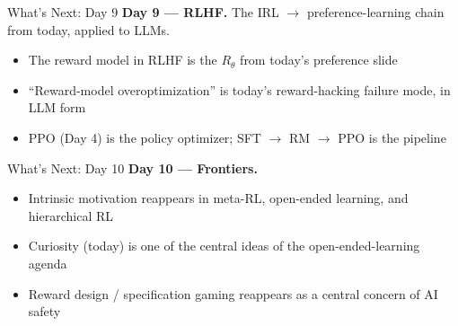\begin{frame}[t]{What's Next: Day 9}
\vspace{0.4em}
\textbf{Day 9 --- RLHF.} The IRL $\to$ preference-learning chain from today, applied to LLMs.
\vspace{0.5em}
\begin{itemize}
    \setlength{\itemsep}{0.6em}
    \item The reward model in RLHF is the $R_\theta$ from today's preference slide
    \item ``Reward-model overoptimization'' is today's reward-hacking failure mode, in LLM form
    \item PPO (Day 4) is the policy optimizer; SFT $\to$ RM $\to$ PPO is the pipeline
\end{itemize}
\end{frame}

\begin{frame}[t]{What's Next: Day 10}
\vspace{0.4em}
\textbf{Day 10 --- Frontiers.}
\vspace{0.5em}
\begin{itemize}
    \setlength{\itemsep}{0.7em}
    \item Intrinsic motivation reappears in meta-RL, open-ended learning, and hierarchical RL
    \item Curiosity (today) is one of the central ideas of the open-ended-learning agenda
    \item Reward design / specification gaming reappears as a central concern of AI safety
\end{itemize}
\end{frame}

